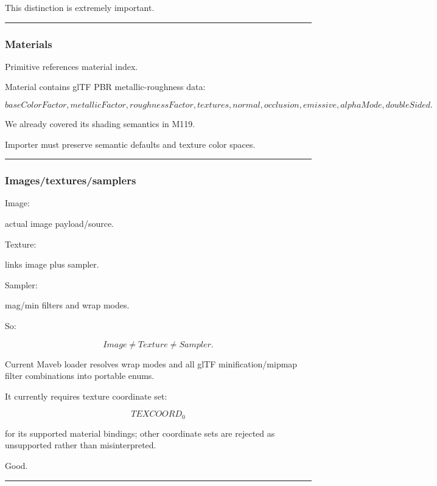 This distinction is extremely important.

\begin{center}\rule{0.5\linewidth}{0.5pt}\end{center}

\subsubsection{Materials}\label{materials}

Primitive references material index.

Material contains glTF PBR metallic-roughness data:

\[
baseColorFactor,
metallicFactor,
roughnessFactor,
textures,
normal,
occlusion,
emissive,
alphaMode,
doubleSided.
\]

We already covered its shading semantics in M119.

Importer must preserve semantic defaults and texture color spaces.

\begin{center}\rule{0.5\linewidth}{0.5pt}\end{center}

\subsubsection{Images/textures/samplers}\label{imagestexturessamplers}

Image:

actual image payload/source.

Texture:

links image plus sampler.

Sampler:

mag/min filters and wrap modes.

So:

\[
\boxed{
Image
\neq
Texture
\neq
Sampler.
}
\]

Current Maveb loader resolves wrap modes and all glTF minification/mipmap filter combinations into portable enums.

It currently requires texture coordinate set:

\[
TEXCOORD_0
\]

for its supported material bindings; other coordinate sets are rejected as unsupported rather than misinterpreted.

Good.

\begin{center}\rule{0.5\linewidth}{0.5pt}\end{center}

